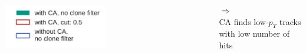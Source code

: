 \documentclass[18pt, aspectratio=169]{beamer}
\begin{document}
\begin{frame}
\begin{columns}
\begin{column}{.5\textwidth}
    \end{column}
  \end{columns}
  \begin{columns}
    \begin{column}{.5\textwidth}
\includegraphics[width=0.5\textwidth]{figures/legend_rejected_vs_other_track_distributions.pdf}
    \end{column}
    \begin{column}{.5\textwidth}
      $\Rightarrow$\\CA finds low-$p_T$ tracks with low number of hits      
    \end{column}
  \end{columns}
\end{frame}
\end{document}
